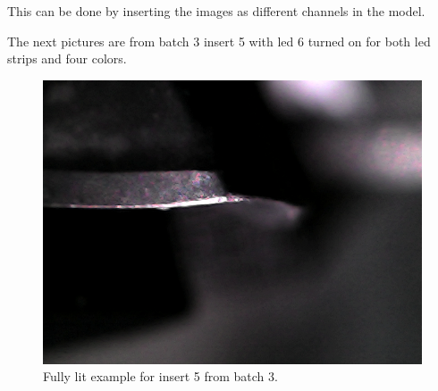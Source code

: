 This can be done by inserting the images as different channels in the model.



The next pictures are from batch 3 insert 5 with led 6 turned on for both led strips and four colors.

\begin{figure}[hbtp]
\centering
\includegraphics[width=.3\textwidth, keepaspectratio=true]{./fig/Vision/Dataset/automated_datasets/2_created_datasets/1_Birthday_dataset/b_003_p_005_l_000_b.png}
\caption{Fully lit example for insert 5 from batch 3.}
\end{figure}

